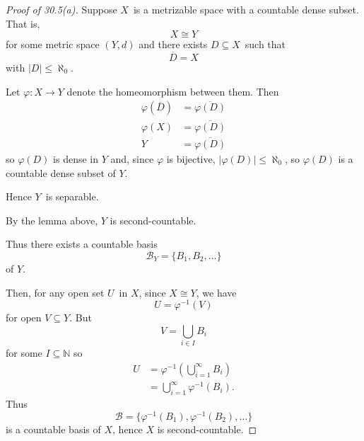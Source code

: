\documentclass[11pt]{article}
\begin{document}
\begin{proof}[Proof of 30.5(a)]
    Suppose $X$ is a metrizable space with a countable dense 
    subset. That is, 
    \[
        X \cong Y
    \]
    for some metric space $(Y,d)$ and there exists 
    $D\subseteq X$ such that 
    \[
        \overline D = X
    \]
    with $|D| \leq \aleph_0$. 

    Let $\varphi : X \to Y$ denote 
    the homeomorphism between them. 
    Then 
    \begin{align*}
        \varphi(\overline D) &= \overline{\varphi(D)} \\ 
        \varphi(X) &= \overline{\varphi(D)} \\ 
        Y &= \overline{\varphi(D)} 
    \end{align*}
    so $\varphi(D)$ 
    is dense in $Y$ and, since $\varphi$ is bijective, 
    $|\varphi(D)| \leq \aleph_0$, so 
    $\varphi(D)$ is a countable dense subset of $Y$. 

    Hence $Y$ is separable.

    By the lemma above, 
    $Y$ is second-countable. 

    Thus there exists a countable basis 
    \[
        \mathcal B_Y = \{B_1,B_2,\ldots\}
    \]
    of $Y$. 

    Then, for any open set $U$ in 
    $X$, since $X \cong Y$, we have 
    \[
        U = \varphi^{-1}(V)
    \]
    for open $V\subseteq Y$. 
    But 
    \[
        V = \bigcup_{i\in I} B_i 
    \]
    for some $I \subseteq \mathbb N$ 
    so 
    \begin{align*}
        U &= \varphi^{-1}\left(\bigcup_{i=1}^\infty B_i\right) \\ 
          &= \bigcup_{i=1}^\infty \varphi^{-1}(B_i). 
    \end{align*}
    Thus 
    \[
        \mathcal B = \{\varphi^{-1}(B_1), \varphi^{-1}(B_2), 
        \ldots\}
    \]
    is a countable basis of $X$, hence 
    $X$ is second-countable. 

\end{proof}
\end{document}
